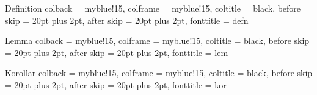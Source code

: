
\newcommand{\N}{\mathbb{N}}          %
\newcommand{\Z}{\mathbb{Z}}          %
\newcommand{\Q}{\mathbb{Q}}          %
\newcommand{\R}{\mathbb{R}}          %
\newcommand{\C}{\mathbb{C}}          %
\newcommand{\ind}{\mathbbm{1}}       %
\newcommand{\bigO}{\mathcal{O}}      %
\renewcommand{\vec}[1]{\bm{#1}}      %
\usepackage{xcolor}
\usepackage{pgfplots}

\theoremstyle{plain}                 %

\theoremstyle{definition}            %

{Definition}
{
colback		= myblue!15,
colframe	= myblue!15,
coltitle	= black,
before skip	= 20pt plus 2pt,
after skip	= 20pt plus 2pt,
fonttitle	= \bfseries
}
{defn}

{Lemma}
{
colback		= myblue!15,
colframe	= myblue!15,
coltitle	= black,
before skip	= 20pt plus 2pt,
after skip	= 20pt plus 2pt,
fonttitle	= \bfseries
}
{lem}


{Korollar}
{
colback		= myblue!15,
colframe	= myblue!15,
coltitle	= black,
before skip	= 20pt plus 2pt,
after skip	= 20pt plus 2pt,
fonttitle	= \bfseries
}
{kor}


